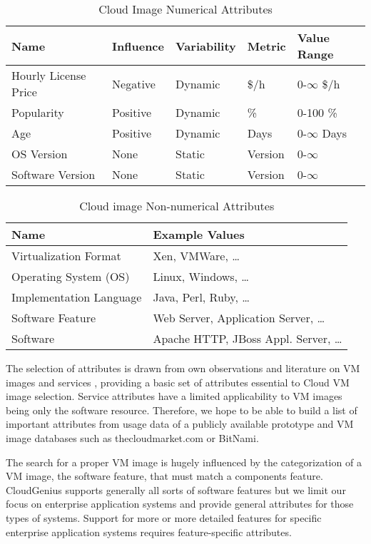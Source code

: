 \documentclass[10pt]{article}
\begin{document}
\begin{table}[h]
\centering
\caption{Cloud Image Numerical Attributes}\label{image-numerical-attributes}
\begin{tabular}{|l|l|l|l|l|} \hline
Name&Influence&Variability&Metric&Value Range\\ \hline
Hourly License Price&Negative&Dynamic&\$/h&0-$\infty$ \$/h\\
Popularity&Positive&Dynamic&\%&0-100 \%\\
Age&Positive&Dynamic&Days&0-$\infty$ Days\\
OS Version&None&Static&Version&0-$\infty$\\
Software Version&None&Static&Version&0-$\infty$\\
\hline\end{tabular}
\end{table}

\begin{table}[h]
\centering
\caption{Cloud image Non-numerical Attributes}\label{image-nonnumerical-attributes}
\begin{tabular}{|l|l|} \hline
Name&Example Values\\ \hline
Virtualization Format&Xen, VMWare, \ldots\\
Operating System (OS)&Linux, Windows, \ldots\\
Implementation Language&Java, Perl, Ruby, \ldots\\
Software Feature&Web Server, Application Server, \ldots\\
Software&Apache HTTP, JBoss Appl. Server, \ldots\\
\hline\end{tabular}
\end{table}

The selection of attributes is drawn from own observations and literature on VM images and services \cite{dastjerdi2010effective}\cite{kalepu2003verity}, providing a basic set of attributes essential to Cloud VM image selection. Service attributes have a limited applicability to VM images being only the software resource. Therefore, we hope to be able to build a list of important attributes from usage data of a publicly available prototype\cite{cumulusgenius2011,cumulusgeniusonline2011} and VM image databases such as thecloudmarket.com\cite{cloudmarket2011} or BitNami\cite{bitnami2011}.

The search for a proper VM image is hugely influenced by the categorization of a VM image, the software feature, that must match a components feature. CloudGenius supports generally all sorts of software features but we limit our focus on enterprise application systems and provide general attributes for those types of systems. Support for more or more detailed features for specific enterprise application systems requires feature-specific attributes.
\end{document}
